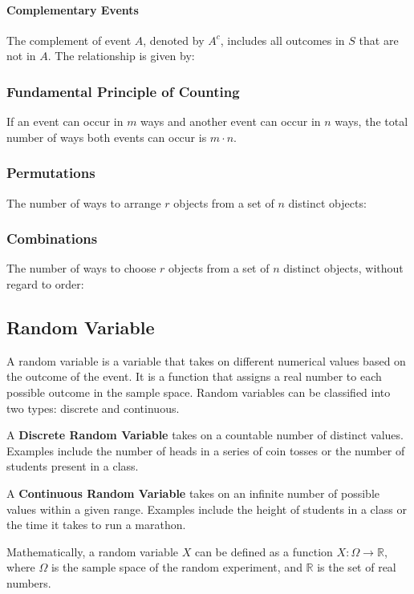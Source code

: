 \paragraph{Complementary Events}
The complement of event \( A \), denoted by \( A^c \), includes all outcomes in \( S \) that are not in \( A \). The relationship is given by:

\subsubsection{Fundamental Principle of Counting} If an event can occur in \( m \) ways and another event can occur in \( n \) ways, the total number of ways both events can occur is \( m \cdot n \).
    
\subsubsection{Permutations} The number of ways to arrange \( r \) objects from a set of \( n \) distinct objects:

\subsubsection{Combinations} The number of ways to choose \( r \) objects from a set of \( n \) distinct objects, without regard to order:


\subsection{Random Variable}\label{Random Variable}
A random variable is a variable that takes on different numerical values based on the outcome of the event. It is a function that assigns a real number to each possible outcome in the sample space. Random variables can be classified into two types: discrete and continuous.

A \textbf{Discrete Random Variable} takes on a countable number of distinct values. Examples include the number of heads in a series of coin tosses or the number of students present in a class.

A \textbf{Continuous Random Variable} takes on an infinite number of possible values within a given range. Examples include the height of students in a class or the time it takes to run a marathon.

Mathematically, a random variable $X$ can be defined as a function $X: \Omega \rightarrow \mathbb{R}$, where $\Omega$ is the sample space of the random experiment, and $\mathbb{R}$ is the set of real numbers.

